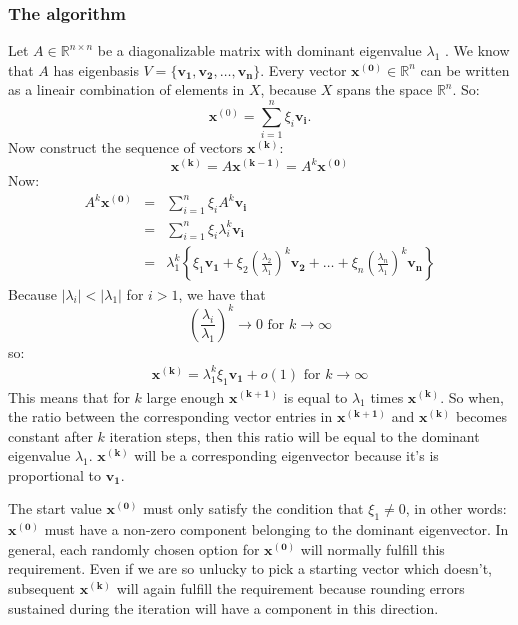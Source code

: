 \documentclass[a4paper,11pt]{report}
\newcommand{\R}{{\mathbb R}}
\begin{document}
\subsubsection{The algorithm}
Let $A \in \R^{n\times n}$ be a diagonalizable matrix with dominant eigenvalue $\lambda_1$ 
. We know that $A$ has eigenbasis $V=\{\mathbf{v_1}, \mathbf{v_2},\ldots,\mathbf{v_n}\}$. Every vector
$\mathbf{\mathbf{x}^{(0)}} \in \R^n$ can be written as a lineair combination of elements in 
$X$, because $X$ spans the space $\R^n$. So:
$$\mathbf{x}^{(0)} = \sum_{i=1}^n \xi_i \mathbf{v_i}.$$
Now construct the sequence of vectors $\mathbf{x^{(k)}}$:
$$\mathbf{x^{(k)}} = A\mathbf{x^{(k-1)}} = A^k\mathbf{x^{(0)}}$$
Now:
\begin{eqnarray*}
  A^k\mathbf{x^{(0)}} &=& \sum^n_{i=1}\xi_i A^k \mathbf{v_i}\\
  &=& \sum^n_{i=1}\xi_i \lambda_i^k \mathbf{v_i}\\
  &=& \lambda_1^k \left\{\xi_1 \mathbf{v_1} + \xi_2\left(\frac{\lambda_2}{\lambda_1}\right)^k \mathbf{v_2} + \ldots +
  \xi_n\left(\frac{\lambda_n}{\lambda_1}\right)^k \mathbf{v_n} \right\}
\end{eqnarray*}
Because $|\lambda_i| < |\lambda_1|$ for $i > 1 $, we have that 
$$\left(\frac{\lambda_i}{\lambda_1}\right)^k \to 0 \text{ for } k \to \infty$$
so:
\begin{eqnarray}\label{tijdscomplexiteit}
  \mathbf{x^{(k)}} = \lambda_1^k \xi_1\mathbf{v_1} + o(1) \text{ for } k \to \infty
\end{eqnarray}
This means that for $k$ large enough $\mathbf{x^{(k+1)}}$ is equal to $\lambda_1$ times $\mathbf{x^{(k)}}$. So when, the ratio 
between the corresponding
vector entries in $\mathbf{x^{(k+1)}}$ and $\mathbf{x^{(k)}}$ becomes constant 
after $k$ iteration steps, then this ratio will be equal to the dominant eigenvalue 
$\lambda_1$. $\mathbf{x^{(k)}}$ will be a corresponding eigenvector because it's is 
proportional to $\mathbf{v_1}$. 

The start value $\mathbf{x^{(0)}}$ must only satisfy the condition that $\xi_1 \not = 
0$, in other words: $\mathbf{x^{(0)}}$ must have a non-zero component belonging to the 
dominant eigenvector. In general, each randomly chosen option for  $\mathbf{x^{(0)}}$ 
will normally fulfill this requirement. Even if we are so unlucky to pick a starting 
vector which doesn't, subsequent $\mathbf{x^{(k)}}$ will again fulfill the 
requirement
because rounding errors sustained during the iteration will have a component in 
this direction.
\end{document}
